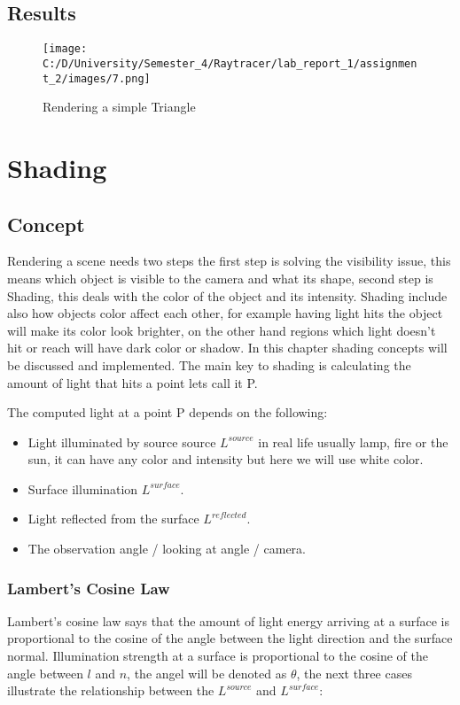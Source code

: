 \documentclass{article}
\begin{document}
	
	\subsection{Results}
	\begin{figure}[H]
		\begin{center}
			\texttt{[image: C:/D/University/Semester\_4/Raytracer/lab\_report\_1/assignment\_2/images/7.png]}
			
			\caption{Rendering a simple Triangle}
			\label{fig:boat1}
		\end{center}
	\end{figure}

\clearpage


\section{Shading}
\subsection{Concept}

Rendering a scene needs two steps the first step is solving the visibility issue, this means which object is visible to the camera and what its shape, second step is Shading, this deals with the color of the object and its intensity. Shading include also how objects color affect each other, for example having light hits the object will make its color look brighter, on the other hand regions which light doesn't hit or reach will have dark color or shadow. In this chapter shading concepts will be discussed and implemented.  The main key to shading is calculating the amount of light that hits a point lets call it P. 

The computed light at a point P depends on the following: 

\begin{itemize}
	\item Light illuminated by source source  $L^{source}$  in real life usually lamp, fire or the sun, it can have any color and intensity but here we will use white color. 
	\item Surface illumination $L^{surface}$.
	\item Light reflected from the surface $L^{reflected}$.
	\item The observation angle / looking at angle / camera. 
\end{itemize}




\subsubsection{Lambert’s Cosine Law}
Lambert's cosine law says that the amount of light energy arriving at a surface is proportional to the cosine of the angle between the light direction and the surface normal. Illumination strength at a surface is proportional to the cosine of the angle between $l$ and $n$, the angel will be denoted as $\theta$, the next three cases illustrate the relationship between the  $L^{source}$ and  $L^{surface}$:
\end{document}
